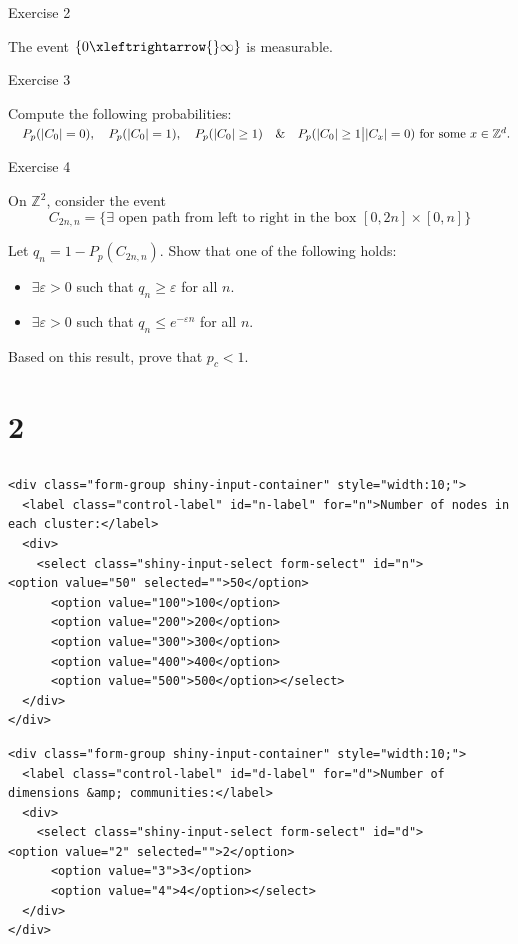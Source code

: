 \documentclass[
  letterpaper,
  DIV=11,
  numbers=noendperiod]{scrartcl}
\providecommand{\tightlist}{%
  \setlength{\itemsep}{0pt}\setlength{\parskip}{0pt}}\usepackage{longtable,booktabs,array}
\begin{document}
Exercise 2

The event \(\{0 \xleftrightarrow{} \infty\}\) is measurable.

Exercise 3

Compute the following probabilities:
\(\quad P_p(|C_0| = 0), \quad P_p(|C_0| = 1), \quad P_p(|C_0| \geq 1) \quad \& \quad P_p(|C_0| \geq 1 \big{|} |C_x| = 0) \text{ for some } x \in \mathbb{Z}^d.\)

Exercise 4

On \(\mathbb{Z}^2\), consider the event
\[C_{2n,n} = \{\exists \text{ open path from left to right in the box } [0, 2n] \times [0, n]\}\]

Let \(q_n = 1 - P_p(C_{2n,n})\). Show that one of the following holds:

\begin{itemize}
\tightlist
\item
  \(\exists \varepsilon > 0\) such that \(q_n \geq \varepsilon\) for all
  \(n\).
\item
  \(\exists \varepsilon > 0\) such that \(q_n \leq e^{- \varepsilon n}\)
  for all \(n\).
\end{itemize}

Based on this result, prove that \(p_c < 1\).

\section{2}\label{section-2}

\subsection{}\label{section-3}

\label{input_selects_2}
\label{input_selects_2-1}
\begin{verbatim}
<div class="form-group shiny-input-container" style="width:10;">
  <label class="control-label" id="n-label" for="n">Number of nodes in each cluster:</label>
  <div>
    <select class="shiny-input-select form-select" id="n">      <option value="50" selected="">50</option>
      <option value="100">100</option>
      <option value="200">200</option>
      <option value="300">300</option>
      <option value="400">400</option>
      <option value="500">500</option></select>
  </div>
</div>
\end{verbatim}

\label{input_selects_2-2}
\begin{verbatim}
<div class="form-group shiny-input-container" style="width:10;">
  <label class="control-label" id="d-label" for="d">Number of dimensions &amp; communities:</label>
  <div>
    <select class="shiny-input-select form-select" id="d">      <option value="2" selected="">2</option>
      <option value="3">3</option>
      <option value="4">4</option></select>
  </div>
</div>
\end{verbatim}
\end{document}
